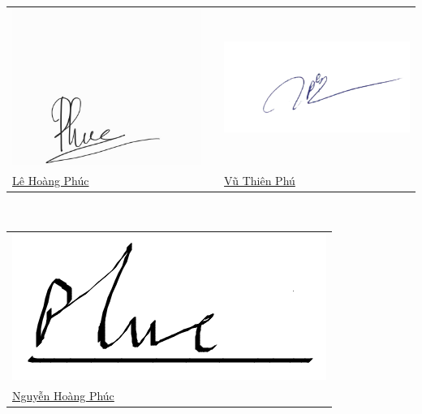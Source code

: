 \documentclass[13pt,a4paper]{article}
\begin{document}
\begin{tabular}{p{}cp{}}

  \includegraphics[width=\linewidth]{PhucLe.jpg} & & \includegraphics[width=\linewidth]{Phu.png} \\

  \centering \href{https://www.facebook.com/profile.php?id=100004563106812}{ Lê Hoàng Phúc } &  & \centering \href{https://www.facebook.com/profile.php?id=100003962510921}{ Vũ Thiên Phú }
\end{tabular} \\[2cm]

\begin{tabular}{p{}}

  \includegraphics[width=\linewidth]{PhucNguyen.png} \\

  \centering \href{https://www.facebook.com/nhphuc0703}{ Nguyễn Hoàng Phúc }
\end{tabular} \\
\newpage
\end{document}
